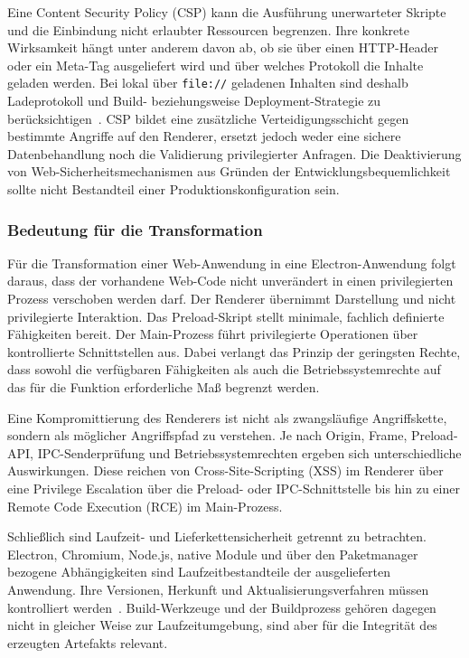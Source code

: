 Eine Content Security Policy (CSP) kann die Ausführung unerwarteter Skripte und die Einbindung nicht erlaubter Ressourcen begrenzen.
Ihre konkrete Wirksamkeit hängt unter anderem davon ab, ob sie über einen HTTP-Header oder ein Meta-Tag ausgeliefert wird und über welches Protokoll die Inhalte geladen werden.
Bei lokal über \texttt{file://} geladenen Inhalten sind deshalb Ladeprotokoll und Build- beziehungsweise Deployment-Strategie zu berücksichtigen~\cite{electron2026security}.
CSP bildet eine zusätzliche Verteidigungsschicht gegen bestimmte Angriffe auf den Renderer, ersetzt jedoch weder eine sichere Datenbehandlung noch die Validierung privilegierter Anfragen.
Die Deaktivierung von Web-Sicherheitsmechanismen aus Gründen der Entwicklungsbequemlichkeit sollte nicht Bestandteil einer Produktionskonfiguration sein.

\subsubsection{Bedeutung für die Transformation}
Für die Transformation einer Web-Anwendung in eine Electron-Anwendung folgt daraus, dass der vorhandene Web-Code nicht unverändert in einen privilegierten Prozess verschoben werden darf.
Der Renderer übernimmt Darstellung und nicht privilegierte Interaktion.
Das Preload-Skript stellt minimale, fachlich definierte Fähigkeiten bereit.
Der Main-Prozess führt privilegierte Operationen über kontrollierte Schnittstellen aus.
Dabei verlangt das Prinzip der geringsten Rechte, dass sowohl die verfügbaren Fähigkeiten als auch die Betriebssystemrechte auf das für die Funktion erforderliche Maß begrenzt werden.

Eine Kompromittierung des Renderers ist nicht als zwangsläufige Angriffskette, sondern als möglicher Angriffspfad zu verstehen.
Je nach Origin, Frame, Preload-API, IPC-Senderprüfung und Betriebssystemrechten ergeben sich unterschiedliche Auswirkungen.
Diese reichen von Cross-Site-Scripting (XSS) im Renderer über eine Privilege Escalation über die Preload- oder IPC-Schnittstelle bis hin zu einer Remote Code Execution (RCE) im Main-Prozess.

Schließlich sind Laufzeit- und Lieferkettensicherheit getrennt zu betrachten.
Electron, Chromium, Node.js, native Module und über den Paketmanager bezogene Abhängigkeiten sind Laufzeitbestandteile der ausgelieferten Anwendung.
Ihre Versionen, Herkunft und Aktualisierungsverfahren müssen kontrolliert werden~\cite{electron2026security}.
Build-Werkzeuge und der Buildprozess gehören dagegen nicht in gleicher Weise zur Laufzeitumgebung, sind aber für die Integrität des erzeugten Artefakts relevant.

